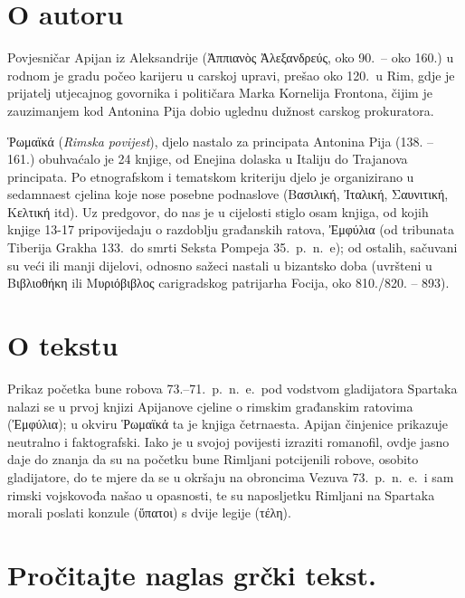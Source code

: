 \section*{O autoru}

Povjesničar Apijan iz Aleksandrije \textgreek[variant=ancient]{(Ἀππιανὸς Ἀλεξανδρεύς,} oko 90.\ – oko 160.) u rodnom je gradu počeo karijeru u carskoj upravi, prešao oko 120.\ u Rim, gdje je prijatelj utjecajnog govornika i političara Marka Kornelija Frontona, čijim je zauzimanjem kod Antonina Pija dobio uglednu dužnost carskog prokuratora.

\textgreek[variant=ancient]{Ῥωμαϊκά} (\textit{Rimska povijest}), djelo nastalo za principata Antonina Pija (138. – 161.) obuhvaćalo je 24 knjige, od Enejina dolaska u Italiju do Trajanova principata. Po etnografskom i tematskom kriteriju djelo je organizirano u sedamnaest cjelina koje nose posebne podnaslove \textgreek[variant=ancient]{(Βασιλική, Ἰταλική, Σαυνιτική, Κελτική} itd). Uz predgovor, do nas je u cijelosti stiglo osam knjiga, od kojih knjige 13-17 pripovijedaju o razdoblju građanskih ratova, \textgreek[variant=ancient]{Ἐμφύλια} (od tribunata Tiberija Grakha 133.\ do smrti Seksta Pompeja 35.\ p.~n.~e); od ostalih, sačuvani su veći ili manji dijelovi, odnosno sažeci nastali u bizantsko doba (uvršteni u \textgreek[variant=ancient]{Βιβλιοθήκη ili Μυριόβιβλος} carigradskog patrijarha Focija, oko 810./820. – 893).

\section*{O tekstu}

Prikaz početka bune robova 73.–71.\ p.~n.~e.\ pod vodstvom gladijatora Spartaka nalazi se u prvoj knjizi Apijanove cjeline o rimskim građanskim ratovima \textgreek[variant=ancient]{(Ἐμφύλια);} u okviru \textgreek[variant=ancient]{Ῥωμαϊκά} ta je knjiga četrnaesta. Apijan činjenice prikazuje neutralno i faktografski. Iako je u svojoj povijesti izraziti romanofil, ovdje jasno daje do znanja da su na početku bune Rimljani potcijenili robove, osobito gladijatore, do te mjere da se u okršaju na obroncima Vezuva 73.\ p.~n.~e.\ i sam rimski vojskovođa našao u opasnosti, te su naposljetku Rimljani na Spartaka morali poslati konzule \textgreek[variant=ancient]{(ὕπατοι)} s dvije legije \textgreek[variant=ancient]{(τέλη).}


\section*{Pročitajte naglas grčki tekst.}

